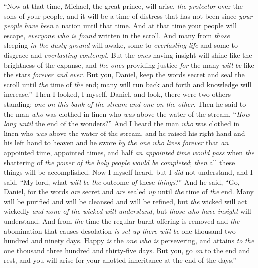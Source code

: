 \begin{biblechapter} %
 “Now at that time, Michael, the great prince, will arise, \textit{the protector} over the sons of your people, and it will be a time of distress that has not been since \textit{your people} \textit{have been} a nation until that time. And at that time your people will escape, \textit{everyone who is found} written in the scroll.
\verse And many from \textit{those} sleeping \textit{in the dusty ground} will awake, some to \textit{everlasting life} and some to disgrace and \textit{everlasting contempt}.
\verse But the \textit{ones} having insight will shine like the brightness of the expanse, and \textit{the ones} providing justice \textit{for} the many \textit{will be} like the stars \textit{forever and ever}.
\verse But you, Daniel, keep the words secret and seal the scroll until \textit{the} time of \textit{the} end; many will run back and forth and knowledge will increase.”
\verse Then I looked, I myself, Daniel, and look, there were two others standing: \textit{one on this bank of the stream and one on the other}.
\verse Then he said to the man \textit{who} was clothed in linen who \textit{was} above the water of the stream, “\textit{How long until} the end of the wonders?”
\verse And I heard the man \textit{who} was clothed in linen who \textit{was} above the water of the stream, and he raised his right hand and his left hand to heaven and he swore \textit{by the one who lives forever} that \textit{an} appointed time, appointed times, and half \textit{an appointed time} \textit{would pass} when \textit{the} shattering of \textit{the power of the holy people} \textit{would be completed}; \textit{then} all these things will be accomplished.
 Now I myself heard, but I \textit{did} not understand, and I said, “My lord, what \textit{will be the} outcome \textit{of} these \textit{things}?”
\verse And he said, “Go, Daniel, for the words \textit{are} secret and \textit{are} sealed \textit{up} until \textit{the} time of \textit{the} end.
\verse Many will be purified and will be cleansed and will be refined, but \textit{the} wicked will act wickedly \textit{and none of the wicked will understand}, but \textit{those who have insight} will understand.
\verse And from \textit{the} time the regular burnt offering is removed and \textit{the} abomination that causes desolation \textit{is set up} \textit{there will be} one thousand two hundred and ninety days.
\verse Happy \textit{is} the \textit{one who is} persevering, and attains \textit{to} \textit{the} one thousand three hundred and thirty-five days.
\verse But you, go \textit{on} to the end and rest, and you will arise for your allotted inheritance at the end of the days.”
\end{biblechapter}

